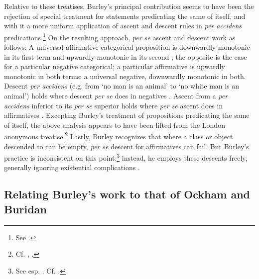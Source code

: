 \documentclass[]{birkjour}
\begin{document}
Relative to these treatises, Burley's principal contribution seems to have been the rejection of special treatment for statements predicating the same of itself, and with it a more uniform application of ascent and descent rules in \textit{per accidens} predications.\footnote{See \autocite[pp. 116-117, par. 19-20; 134, par. 95; p. 158, par. 160.]{Green-Pedersen1980b}.} On the resulting approach, \textit{per se} ascent and descent work as follows: A universal affirmative categorical proposition is downwardly monotonic in its first term and upwardly monotonic in its second \autocite[p. 211.16-20]{BurleyDPAL}; the opposite is the case for a particular negative categorical; a particular affirmative is upwardly monotonic in both terms; a universal negative, downwardly monotonic in both. Descent \textit{per accidens} (e.g. from `no man is an animal' to `no white man is an animal') holds where descent \textit{per se} does in negatives \autocite[pp. 209.35-210.10]{BurleyDPAL}. Ascent from a \textit{per accidens} inferior to its \textit{per se} superior holds where \textit{per se} ascent does in affirmatives \autocite[pp. 116-117, par. 20]{Green-Pedersen1980b}. Excepting Burley's treatment of propositions predicating the same of itself, the above analysis appears to have been lifted from the London anonymous treatise.\footnote{Cf. \autocite[pp. 10-11, par. 35-37]{Green-Pedersen1980a}, \autocite[pp. 116-117, par. 19-20]{Green-Pedersen1980b}.} Lastly, Burley recognizes that where a class or object descended to can be empty, \textit{per se} descent for affirmatives can fail. But Burley's practice is inconsistent on this point:\footnote{See esp. \autocite[pp. 61.4, 85.16; 85.4, 211.27-28]{BurleyDPAL}. Cf. \autocite{Mora-Marquez2015}.} instead, he employs these descents freely, generally ignoring existential complications \autocite[pp. 23.26, 26.26, 31.21, 67.19, 67.30, 85.16, 85.26, 211.27-28]{BurleyDPAL}.
	
	
	
\subsection{Relating Burley's work to that of Ockham and Buridan}
\end{document}
